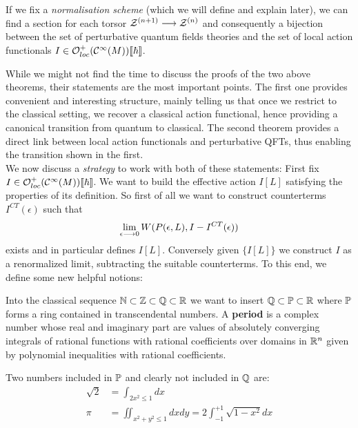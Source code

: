 \begin{theo}
  If we fix a \emph{normalisation scheme} (which we will define and explain later), we can find a section for each torsor $\mathcal{Z}^{(n+1)} \longrightarrow \mathcal{Z}^{(n)}$ and consequently a bijection between the set of perturbative quantum fields theories and the set of local action functionals $I \in \mathcal{O}^+_{loc}(\mathcal{C}^{\infty}(M))\llbracket \hbar \rrbracket$.
\end{theo}

While we might not find the time to discuss the proofs of the two above theorems, their statements are the most important points. The first one provides convenient and interesting structure, mainly telling us that once we restrict to the classical setting, we recover a classical action functional, hence providing a canonical transition from quantum to classical. The second theorem provides a direct link between local action functionals and perturbative QFTs, thus enabling the transition shown in the first.\\

We now discuss a \textit{strategy} to work with both of these statements: First fix $I \in \mathcal{O}^+_{loc}(\mathcal{C}^{\infty}(M))\llbracket \hbar \rrbracket$. We want to build the effective action $I[L]$ satisfying the properties of its definition. So first of all we want to construct counterterms $I^{CT}(\epsilon)$ such that
$$ \lim_{\epsilon \lra 0} W(P(\epsilon,L), I-I^{CT}(\epsilon))$$
exists and in particular defines $I[L]$. Conversely given $\{I[L]\}$ we construct $I$ as a renormalized limit, subtracting the suitable counterterms. To this end, we define some new helpful notions:

\begin{definition}[Periods]
  Into the classical sequence $\mathbb{N} \subset \mathbb{Z} \subset \mathbb{Q} \subset \mathbb{R}$ we want to insert $\mathbb{Q} \subset \mathbb{P} \subset \mathbb{R}$ where $\mathbb{P}$ forms a ring contained in transcendental numbers. A \textbf{period} is a complex number whose real and imaginary part are values of absolutely converging integrals of rational functions with rational coefficients over domains in $\mathbb{R}^n$ given by polynomial inequalities with rational coefficients.
\end{definition}

\begin{example}
  Two numbers included in $\mathbb{P}$ and clearly not included in $\mathbb{Q}$ are:
  \begin{align*}
    \sqrt{2} &= \int_{2x^2 \leq 1} dx \\
    \pi &= \iint_{x^2+y^2\leq 1} dx dy = 2 \int_{-1}^{+1} \sqrt{1-x^2} dx
  \end{align*}
\end{example}

